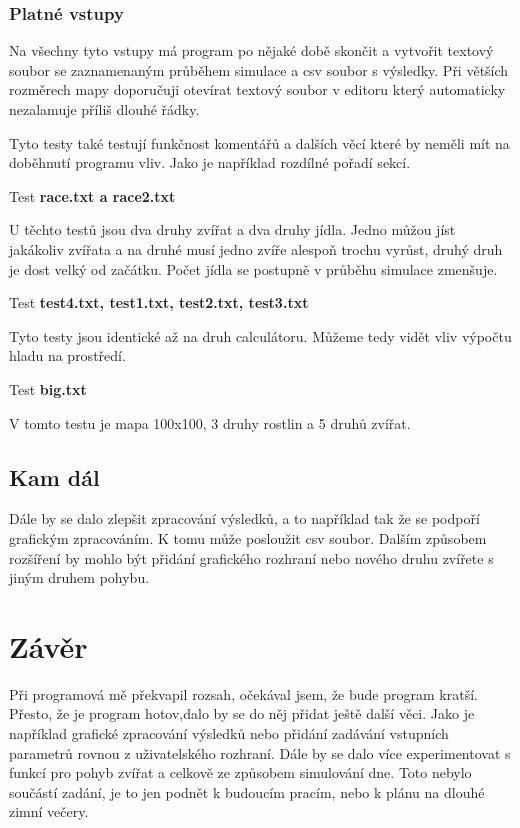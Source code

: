 \documentclass[10pt,a4paper]{article}
\begin{document}
\subsubsection{Platné vstupy}

Na všechny tyto vstupy má program po nějaké době skončit a vytvořit textový soubor se zaznamenaným průběhem simulace a csv soubor s výsledky. Při větších rozměrech mapy doporučuji otevírat textový soubor v editoru který automaticky nezalamuje příliš dlouhé řádky. 

Tyto testy také testují funkčnost komentářů a dalších věcí které by neměli mít na doběhnutí programu vliv. Jako je například rozdílné pořadí sekcí.


Test \textbf{race.txt a race2.txt}

U těchto testů jsou dva druhy zvířat a dva druhy jídla. Jedno můžou jíst jakákoliv zvířata a na druhé musí jedno zvíře alespoň trochu vyrůst, druhý druh je dost velký od začátku. Počet jídla se postupně v průběhu simulace zmenšuje.





Test \textbf{test4.txt, test1.txt, test2.txt, test3.txt}

Tyto testy jsou identické až na druh calculátoru. Můžeme tedy vidět vliv výpočtu hladu na prostředí.

Test \textbf{big.txt}

V tomto testu je mapa 100x100, 3 druhy rostlin a 5 druhů zvířat.
\subsection{Kam dál}

Dále by se dalo zlepšit zpracování výsledků, a to například tak že se podpoří grafickým zpracováním.  K tomu může posloužit csv soubor. Dalším způsobem rozšíření by mohlo být přidání grafického rozhraní nebo nového druhu zvířete s jiným druhem pohybu. 

\section{Závěr}

Při programová mě překvapil rozsah, očekával jsem, že bude program kratší. Přesto, že je program hotov,dalo by se do něj přidat ještě další věci. Jako je například grafické zpracování výsledků nebo přidání zadávání vstupních parametrů rovnou z uživatelského rozhraní. Dále by se dalo více experimentovat s funkcí pro pohyb zvířat a celkově ze způsobem simulování dne. Toto nebylo součástí zadání, je to jen podnět k budoucím pracím, nebo k plánu na dlouhé zimní večery.  
\end{document}
